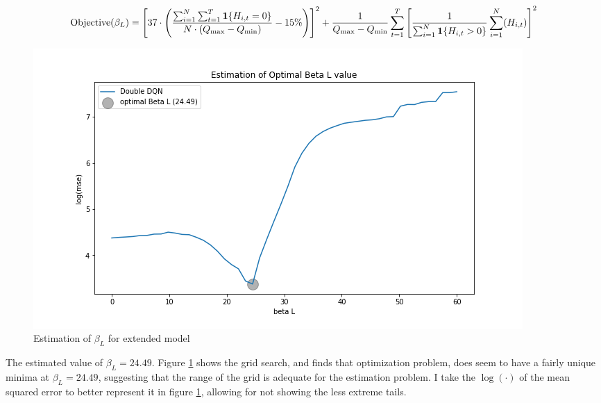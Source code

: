 \begin{equation}
   \text{Objective}(\beta_L) =  \left[ 37 \cdot \left(\frac{\sum_{i=1}^{N} \sum_{t=1}^T \mathbf{1}\{H_{i,t} = 0\}}{ N \cdot (Q_{\max} - Q_{\min} )} - 15\% \right) \right]^2 + \frac{1}{Q_{\max} - Q_{\min}}\sum_{t=1}^{T} \left[ \frac{1}{\sum_{i=1}^{N} \mathbf{1}\{H_{i,t} > 0\}}\sum_{i=1}^N (H_{i,t})\right]^2
\end{equation}

\begin{figure}[ht]
    \centering
    \includegraphics[scale=0.4]{figures/ddqn_extended_model_estimation_beta_L.png}
    \caption{Estimation of $\beta_L$ for extended model}
    \label{fig:estimation_extended}
\end{figure}

The estimated value of $\beta_L = 24.49$. Figure \ref{fig:estimation_extended} shows the grid search, and finds that optimization problem, does seem to have a fairly unique minima at $\beta_L = 24.49$, suggesting that the range of the grid is adequate for the estimation problem. I take the $\log (\cdot)$ of the mean squared error to better represent it in figure \ref{fig:estimation_extended}, allowing for not showing the less extreme tails.